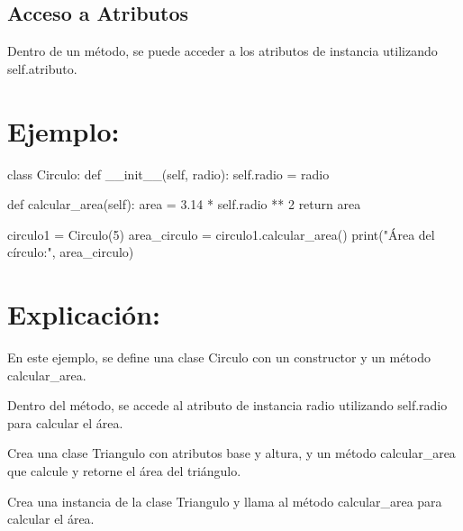 \documentclass[
  a4paper,
  onepage,
  openany]{scrreprt}
\newenvironment{Shaded}{\begin{snugshade}}{\end{snugshade}}
\newcommand{\BuiltInTok}[1]{\textcolor[rgb]{0.00,0.23,0.31}{#1}}
\newcommand{\ControlFlowTok}[1]{\textcolor[rgb]{0.00,0.23,0.31}{#1}}
\newcommand{\DecValTok}[1]{\textcolor[rgb]{0.68,0.00,0.00}{#1}}
\newcommand{\FloatTok}[1]{\textcolor[rgb]{0.68,0.00,0.00}{#1}}
\newcommand{\FunctionTok}[1]{\textcolor[rgb]{0.28,0.35,0.67}{#1}}
\newcommand{\KeywordTok}[1]{\textcolor[rgb]{0.00,0.23,0.31}{#1}}
\newcommand{\NormalTok}[1]{\textcolor[rgb]{0.00,0.23,0.31}{#1}}
\newcommand{\OperatorTok}[1]{\textcolor[rgb]{0.37,0.37,0.37}{#1}}
\newcommand{\StringTok}[1]{\textcolor[rgb]{0.13,0.47,0.30}{#1}}
\newcommand{\VariableTok}[1]{\textcolor[rgb]{0.07,0.07,0.07}{#1}}
\begin{document}
\hypertarget{acceso-a-atributos-1}{%
\subsection{Acceso a Atributos}\label{acceso-a-atributos-1}}

Dentro de un método, se puede acceder a los atributos de instancia
utilizando self.atributo.

\hypertarget{ejemplo-53}{%
\section{Ejemplo:}\label{ejemplo-53}}

\begin{Shaded}
\begin{Highlighting}[]
\KeywordTok{class}\NormalTok{ Circulo:}
    \KeywordTok{def} \FunctionTok{\_\_init\_\_}\NormalTok{(}\VariableTok{self}\NormalTok{, radio):}
        \VariableTok{self}\NormalTok{.radio }\OperatorTok{=}\NormalTok{ radio}

    \KeywordTok{def}\NormalTok{ calcular\_area(}\VariableTok{self}\NormalTok{):}
\NormalTok{        area }\OperatorTok{=} \FloatTok{3.14} \OperatorTok{*} \VariableTok{self}\NormalTok{.radio }\OperatorTok{**} \DecValTok{2}
        \ControlFlowTok{return}\NormalTok{ area}

\NormalTok{circulo1 }\OperatorTok{=}\NormalTok{ Circulo(}\DecValTok{5}\NormalTok{)}
\NormalTok{area\_circulo }\OperatorTok{=}\NormalTok{ circulo1.calcular\_area()}
\BuiltInTok{print}\NormalTok{(}\StringTok{"Área del círculo:"}\NormalTok{, area\_circulo)}
\end{Highlighting}
\end{Shaded}

\hypertarget{explicaciuxf3n-53}{%
\section{Explicación:}\label{explicaciuxf3n-53}}

En este ejemplo, se define una clase Circulo con un constructor y un
método calcular\_area.

Dentro del método, se accede al atributo de instancia radio utilizando
self.radio para calcular el área.

\begin{tcolorbox}[enhanced jigsaw, breakable, opacityback=0, toptitle=1mm, coltitle=black, toprule=.15mm, rightrule=.15mm, colframe=quarto-callout-important-color-frame, opacitybacktitle=0.6, arc=.35mm, title=\textcolor{quarto-callout-important-color}{\faExclamation}\hspace{0.5em}{Actividad Práctica:}, titlerule=0mm, colbacktitle=quarto-callout-important-color!10!white, bottomtitle=1mm, bottomrule=.15mm, colback=white, left=2mm, leftrule=.75mm]

Crea una clase Triangulo con atributos base y altura, y un método
calcular\_area que calcule y retorne el área del triángulo.

Crea una instancia de la clase Triangulo y llama al método
calcular\_area para calcular el área.

\end{tcolorbox}
\end{document}
